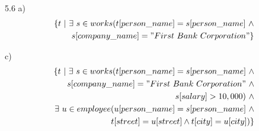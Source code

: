 \documentclass{book}
\begin{document}
5.6 a)
	\begin{equation}
	\begin{split}
		\{t\ |\ \exists\ s \in works(t[person\_name] = s[person\_name]\ \wedge \\
		 s[company\_name] = "First\ Bank\ Corporation"\}
	\end{split}
	\end{equation}

	c)
	\begin{equation}
	\begin{split}
		\{t\ |\ \exists\ s \in works(t[person\_name] = s[person\_name]\ \wedge \\
		 s[company\_name] = "First\ Bank\ Corporation"\ \wedge \\
		 s[salary] > 10,000)\ \wedge \\
		  \exists\ u \in employee(u[person\_name] = s[person\_name]\ \wedge \\
		   t[street] = u[street] \wedge t[city] = u[city])\}
	\end{split}
	\end{equation}
\end{document}
